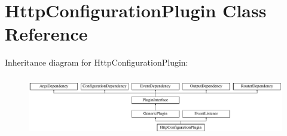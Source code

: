 \hypertarget{classHttpConfigurationPlugin}{\section{Http\-Configuration\-Plugin Class Reference}
\label{classHttpConfigurationPlugin}
}
Inheritance diagram for Http\-Configuration\-Plugin\-:\begin{figure}[H]
\begin{center}
\leavevmode
\includegraphics[height=2.666667cm]{classHttpConfigurationPlugin}
\end{center}
\end{figure}
